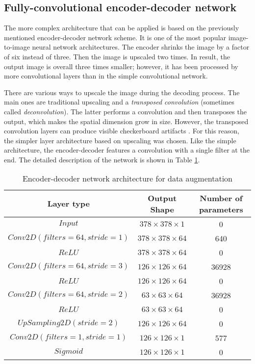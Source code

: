 \subsection{Fully-convolutional encoder-decoder network}
The more complex architecture that can be applied is based on the previously mentioned encoder-decoder network scheme.
It is one of the most popular image-to-image neural network architectures.
The encoder shrinks the image by a factor of six instead of three.
Then the image is upscaled two times.
In result, the output image is overall three times smaller; however, it has been processed by more convolutional layers than in the simple convolutional network.

There are various ways to upscale the image during the decoding process.
The main ones are traditional upscaling and a \textit{transposed convolution} (sometimes called \textit{deconvolution}).
The latter performs a convolution and then transposes the output, which makes the spatial dimension grow in size.
However, the transposed convolution layers can produce visible checkerboard artifacts \cite{odena-2016-deconvolution}.
For this reason, the simpler layer architecture based on upscaling was chosen.
Like the simple architecture, the encoder-decoder features a convolution with a single filter at the end.
The detailed description of the network is shown in Table \ref{tab:autoencoder-arch}.
\begin{table}
    \centering
    \caption{Encoder-decoder network architecture for data augmentation}
    \label{tab:autoencoder-arch}
    \begin{tabular}{ccc}
        \toprule
        Layer type & Output Shape & Number of parameters \\
        \midrule
        $ Input $      & $ 378 \times 378 \times 1 $ & 0                    \\
        $ Conv2D(filters=64, stride=1) $ & $ 378 \times 378 \times 64 $ & 640 \\
        $ ReLU $ & $ 378 \times 378 \times 64 $ & 0 \\
        $ Conv2D(filters=64, stride=3) $ & $ 126 \times 126 \times 64 $ & 36928 \\
        $ ReLU $ & $ 126 \times 126 \times 64 $ & 0 \\
        $ Conv2D(filters=64, stride=2) $ & $ 63 \times 63 \times 64 $ & 36928 \\
        $ ReLU $ & $ 63 \times 63 \times 64 $ & 0 \\
        $ UpSampling2D(stride=2) $ & $ 126 \times 126 \times 64 $ & 0 \\
        $ Conv2D(filters=1, stride=1) $ & $ 126 \times 126 \times 1 $ & 577 \\
        $ Sigmoid $ & $ 126 \times 126 \times 1 $ & 0 \\
        \bottomrule
    \end{tabular}
\end{table}

